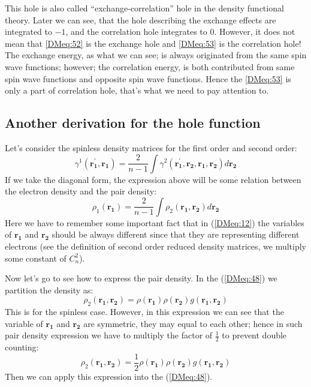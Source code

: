 This hole is also called ``exchange-correlation'' hole in the density
functional theory. Later we can see, that the hole describing the exchange
effects are integrated to $-1$, and the correlation hole integrates to $0$.
However, it does not mean that \ref{DMeq:52} is the exchange hole and
\ref{DMeq:53} is the correlation hole! The exchange energy, as what we can 
see; is always originated from the same spin wave functions; however; the
correlation energy, is both contributed from same spin wave functions and
opposite spin wave functions. Hence the \ref{DMeq:53} is only a part of 
correlation hole, that's what we need to pay attention to.





\subsection{Another derivation for the hole function}
%
%
%
%
%
Let's consider the spinless density matrices for the first order and
second order:
\begin{equation}\label{DMeq:12}
  \gamma^{1}(\bm{r_{1}^{'}}, \bm{r_{1}}) = \dfrac{2}{n-1}\int
  \gamma^{2}(\bm{r_{1}^{'}},\bm{r_{2}},
  \bm{r_{1}},\bm{r_{2}})d\bm{r_{2}}
\end{equation}
If we take the diagonal form, the expression above will be some
relation between the electron density and the pair density:
\begin{equation}
\rho_{1}(\bm{r_{1}}) = \dfrac{2}{n-1}\int
\rho_{2}(\bm{r_{1}},\bm{r_{2}})d\bm{r_{2}}
\end{equation}
Here we have to remember some important fact that in (\ref{DMeq:12})
the variables of $\bm{r_{1}}$ and $\bm{r_{2}}$ should be always
different since that they are representing different electrons (see
the definition of second order reduced density matrices, we multiply
some constant of $C^{2}_{n}$).

Now let's go to see how to express the pair density. In the
(\ref{DMeq:48}) we partition the density as:
\begin{equation}\label{}
\rho_{2}(\bm{r_{1}},\bm{r_{2}}) = \rho(\bm{r_{1}})
\rho(\bm{r_{2}})g(\bm{r_{1}}, \bm{r_{2}})
\end{equation}
This is for the spinless case. However, in this expression we can
see that the variable of $\bm{r_{1}}$ and $\bm{r_{2}}$ are
symmetric, they may equal to each other; hence in such pair density
expression we have to multiply the factor of $\frac{1}{2}$ to
prevent double counting:
\begin{equation}\label{DMeq:14}
\rho_{2}(\bm{r_{1}},\bm{r_{2}}) = \frac{1}{2}\rho(\bm{r_{1}})
\rho(\bm{r_{2}})g(\bm{r_{1}}, \bm{r_{2}})
\end{equation}
Then we can apply this expression into the (\ref{DMeq:48}).

